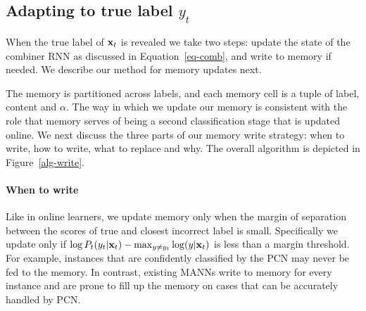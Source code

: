 \documentclass[letterpaper]{article} %
\newcommand{\vek}[1]{{\bf {#1}}}
\newcommand{\vx}{{\vek{x}}}
\def\shiv#1{\todo [color=orange]{Shiv: #1}}
\begin{document}
\subsection{Adapting to true label $y_t$}
When the true label of $\vx_t$ is revealed we take two steps: update the state of the combiner RNN as discussed in Equation~\ref{eq-comb}, and write to memory if needed.  We describe our method for memory updates next.

The memory is partitioned across labels, and each memory cell is a tuple of label, content and $\alpha$.  %
The way in which we update our memory is consistent with the role that memory serves of being a second classification stage that is updated online.  We next discuss the three parts of our memory write strategy: when to write, how to write, what to replace and why. The overall algorithm is depicted in Figure~\ref{alg-write}.
%
\paragraph{When to write}
Like in online learners, we update memory only when the margin of separation between the scores of true and closest incorrect label is small. Specifically we update only if $\log P_t(y_t|\vx_t) - \max_{y \ne y_t} \log (y | \vx_t)$ is less than a margin threshold.  For example, instances that are confidently classified by the PCN may never be fed to the memory.
In contrast,  existing MANNs write to memory for every instance and are prone to fill up the memory on cases that can be accurately handled by PCN.
\end{document}
